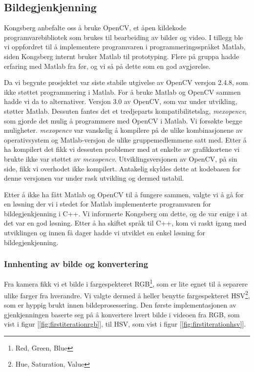 \subsection{Bildegjenkjenning}

Kongsberg anbefalte oss å bruke OpenCV, et åpen kildekode programvarebibliotek som brukes til bearbeiding av bilder og video. I tillegg ble vi oppfordret til å implementere programvaren i programmeringsspråket Matlab, siden Kongsberg internt bruker Matlab til prototyping. Flere på gruppa hadde erfaring med Matlab fra før, og vi så på dette som en god avgjørelse.

Da vi begynte prosjektet var siste stabile utgivelse av OpenCV versjon 2.4.8, som ikke støttet programmering i Matlab. For å bruke Matlab og OpenCV sammen hadde vi da to alternativer. Versjon 3.0 av OpenCV, som var under utvikling, støtter Matlab. Dessuten fantes det et tredjeparts kompatibilitetslag, \emph{mexopencv}, som gjorde det mulig å programmere med OpenCV i Matlab. Vi forsøkte begge muligheter. \emph{mexopencv} var vanskelig å kompilere på de ulike kombinasjonene av operativsystem og Matlab-versjon de ulike gruppemedlemmene satt med. Etter å ha kompilert det fikk vi dessuten problemer med at enkelte av grafikkortene vi brukte ikke var støttet av \emph{mexopencv}. Utviklingsversjonen av OpenCV, på sin side, fikk vi overhodet ikke kompilert. Antakelig skyldes dette at kodebasen for denne versjonen var under rask utvikling og dermed ustabil.

Etter å ikke ha fått Matlab og OpenCV til å fungere sammen, valgte vi å gå for en løsning der vi i stedet for Matlab implementerte programvaren for bildegjenkjenning i C++. Vi informerte Kongsberg om dette, og de var enige i at det var en god løsning. Etter å ha skiftet språk til C++, kom vi raskt igang med utviklingen og innen få dager hadde vi utviklet en enkel løsning for bildegjenkjenning.

\subsubsection{Innhenting av bilde og konvertering}

Fra kamera fikk vi et bilde i fargespekteret RGB\footnote{Red, Green, Blue}, som er lite egnet til å separere ulike farger fra hverandre. Vi valgte dermed å heller benytte fargespekteret HSV\footnote{Hue, Saturation, Value}, som er hyppig brukt innen bildeprosessering. Den første implementasjonen av gjenkjenningen baserte seg på å konvertere hvert bilde i videoen fra RGB, som vist i figur [\ref{fig:firstiterationrgb}], til HSV, som vist i figur [\ref{fig:firstiterationhsv}].

